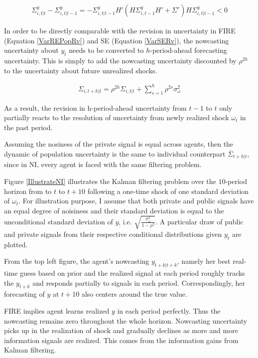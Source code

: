 \documentclass[]{article}
\begin{document}
	\begin{eqnarray}\label{VarNIRv}
		\Sigma^y_{i,t|t} - \Sigma^y_{i,t|t-1} = - \Sigma^y_{i,t|t-1} H'(H \Sigma^y_{i,t-1} H' +\Sigma^v) H \Sigma^y_{i,t|t-1} <0
	\end{eqnarray}
	
	In order to be directly comparable with the revision in uncertainty in FIRE (Equation \ref{VarREPopRv}) and SE (Equation \ref{VarSERv}), the nowcasting uncertainty about $y_t$ needs to be converted to $h$-period-ahead forecasting uncertainty. This is simply to add the nowcasting uncertainty discounted by $\rho^{2h}$ to the uncertainty about future unrealized shocks.   
	
	\begin{eqnarray}\label{VarNIEq}
		\Sigma_{i,t+h|t} = \rho^{2h} \Sigma_{i,t|t} + \sum^{h}_{s=1}\rho^{2s} \sigma^2_{\omega}
	\end{eqnarray}
	
	As a result, the revision in h-period-ahead uncertainty from $t-1$ to $t$ only partially reacts to the resolution of  uncertainty from newly realized shock $\omega_t$ in the past period. 
	
	Assuming the nosiness of the private signal is equal across agents, then the dynamic of population uncertainty is the same to individual counterpart $\bar \Sigma_{t+h|t}$, since in NI, every agent is faced with the same filtering problem.  
	
	Figure \ref{IllustrateNI} illustrates the Kalman filtering problem over the $10$-period horizon from to $t$ to $t+10$  following a one-time shock of one standard deviation of $\omega_t$.  For illustration purpose, I assume that both private and public signals have an equal degree of noisiness and their standard deviation is equal to the unconditional standard deviation of $y$, i.e. $\sqrt{\frac{\sigma^2_\omega}{1-\rho^2}}$.  A particular draw of public and private signals from their respective conditional distributions given $y_t$ are plotted.    
	
	From the top left figure, the agent's nowcasting $y_{t+k|t+k}$, namely her best real-time guess based on prior and the realized signal at each period roughly tracks the $y_{t+k}$ and responds partially to signals in each period. Correspondingly, her forecasting of $y$ at $t+10$ also centers around the true value. 
	
	FIRE implies agent learns realized $y$ in each period perfectly. Thus the nowcasting remains zero throughout the whole horizon. Nowcasting uncertainty picks up in the realization of shock and gradually declines as more and more information signals are realized. This comes from the information gains from Kalman filtering. 
	
\end{document}
